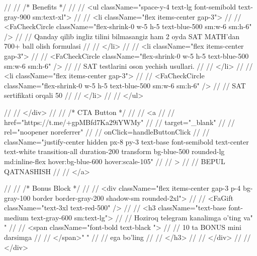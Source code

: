 {// //                         {/* Benefits */}
// //                         <ul className="space-y-4 text-lg font-semibold text-gray-900 sm:text-xl">
// //                             <li className="flex items-center gap-3">
// //                                 <FaCheckCircle className="flex-shrink-0 w-5 h-5 text-blue-500 sm:w-6 sm:h-6" />
// //                                 Qanday qilib ingliz tilini bilmasangiz ham 2 oyda SAT MATH’dan 700+ ball olish formulasi
// //                             </li>
// //                             <li className="flex items-center gap-3">
// //                                 <FaCheckCircle className="flex-shrink-0 w-5 h-5 text-blue-500 sm:w-6 sm:h-6" />
// //                                 SAT testlarini oson yechish usullari.
// //                             </li>
// //                             <li className="flex items-center gap-3">
// //                                 <FaCheckCircle className="flex-shrink-0 w-5 h-5 text-blue-500 sm:w-6 sm:h-6" />
// //                                 SAT sertifikati orqali 50%
// //                             </li>
// //                         </ul>


// //                     </div>
// //                     {/* CTA Button */}
// //                     <a
// //                         href="https://t.me/+gpMBfd7Ka29iYWMy"
// //                         target="_blank"
// //                         rel="noopener noreferrer"
// //                         onClick={handleButtonClick}
// //                         className="justify-center hidden px-8 py-3 text-base font-semibold text-center text-white transition-all duration-200 transform bg-blue-500 rounded-lg md:inline-flex hover:bg-blue-600 hover:scale-105"
// //                     >
// //                         BEPUL QATNASHISH
// //                     </a>



// //                     {/* Bonus Block */}
// //                     <div className="flex items-center gap-3 p-4 bg-gray-100 border border-gray-200 shadow-sm rounded-2xl">
// //                         <FaGift className="text-3xl text-red-500" />
// //                         <h3 className="text-base font-medium text-gray-600 sm:text-lg">
// //                             Hoziroq telegram kanalimga o'ting va{" "}
// //                             <span className="font-bold text-black ">
// //                                 10 ta BONUS mini darsimga
// //                             </span>{" "}
// //                             ega bo'ling
// //                         </h3>
// //                     </div>
// //                 </div>

}
